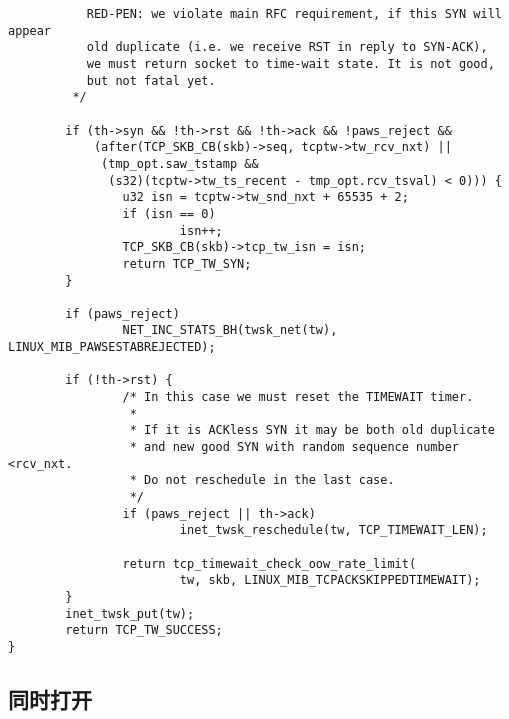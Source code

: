 \begin{verbatim}
           RED-PEN: we violate main RFC requirement, if this SYN will appear
           old duplicate (i.e. we receive RST in reply to SYN-ACK),
           we must return socket to time-wait state. It is not good,
           but not fatal yet.
         */

        if (th->syn && !th->rst && !th->ack && !paws_reject &&
            (after(TCP_SKB_CB(skb)->seq, tcptw->tw_rcv_nxt) ||
             (tmp_opt.saw_tstamp &&
              (s32)(tcptw->tw_ts_recent - tmp_opt.rcv_tsval) < 0))) {
                u32 isn = tcptw->tw_snd_nxt + 65535 + 2;
                if (isn == 0)
                        isn++;
                TCP_SKB_CB(skb)->tcp_tw_isn = isn;
                return TCP_TW_SYN;
        }

        if (paws_reject)
                NET_INC_STATS_BH(twsk_net(tw), LINUX_MIB_PAWSESTABREJECTED);

        if (!th->rst) {
                /* In this case we must reset the TIMEWAIT timer.
                 *
                 * If it is ACKless SYN it may be both old duplicate
                 * and new good SYN with random sequence number <rcv_nxt.
                 * Do not reschedule in the last case.
                 */
                if (paws_reject || th->ack)
                        inet_twsk_reschedule(tw, TCP_TIMEWAIT_LEN);

                return tcp_timewait_check_oow_rate_limit(
                        tw, skb, LINUX_MIB_TCPACKSKIPPEDTIMEWAIT);
        }
        inet_twsk_put(tw);
        return TCP_TW_SUCCESS;
}
\end{verbatim}

\subsection{同时打开}
\label{subsec:fin_at_same_time}
